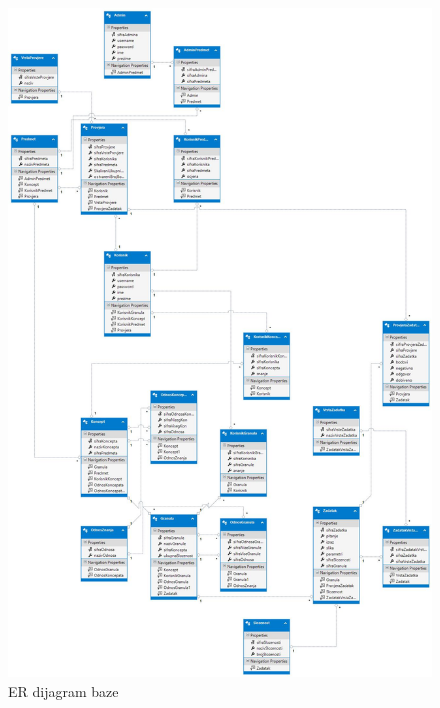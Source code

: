 \documentclass[times, utf8, zavrsni, numeric]{fer}
\begin{document}
\begin{figure}[htb]
	\centering
	\includegraphics[width=\textwidth,height=\textheight,keepaspectratio]{img/ER.jpg}
	\caption{ER dijagram baze}
	\label{fig:ER}
\end{figure}
\end{document}
